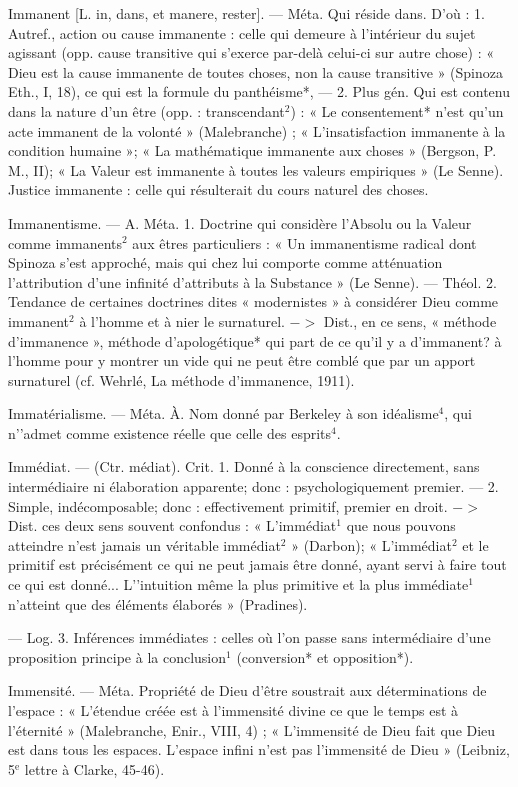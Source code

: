 Immanent [L. in, dans, et manere,
rester]. — Méta. Qui réside dans.
D'où : 1. Autref., action ou cause
immanente : celle qui demeure à
l’intérieur du sujet agissant (opp.
cause transitive qui s'exerce par-delà
celui-ci sur autre chose) : « Dieu
est la cause immanente de toutes
choses, non la cause transitive »
(Spinoza Eth., I, 18), ce qui est la
formule du panthéisme*, — 2.
Plus gén. Qui est contenu dans la
nature d’un être (opp. : transcendant$^2$) : « Le consentement* n'est
qu’un acte immanent de la volonté »
(Malebranche) ; « L’insatisfaction immanente à la condition humaine »;
« La mathématique immanente aux
choses » (Bergson, P. M., II); « La
Valeur est immanente à toutes les
valeurs empiriques » (Le Senne).
Justice immanente : celle qui résulterait du cours naturel des choses.

Immanentisme. — A. Méta. 1. Doctrine qui considère l’Absolu ou la
Valeur comme immanents$^2$ aux êtres
particuliers : « Un immanentisme
radical dont Spinoza s’est approché,
mais qui chez lui comporte comme
atténuation l'attribution d’une infinité d’attributs à la Substance »
(Le Senne). — Théol. 2. Tendance
de certaines doctrines dites « modernistes » à considérer Dieu comme
immanent$^2$ à l’homme et à nier le
surnaturel. $->$ Dist., en ce sens,
« méthode d’immanence », méthode
d’apologétique* qui part de ce qu'il
y a d’immanent? à l’homme pour y
montrer un vide qui ne peut être
comblé que par un apport surnaturel (cf. Wehrlé, La méthode d’immanence, 1911).

Immatérialisme. — Méta. À. Nom
donné par Berkeley à son idéalisme$^4$, qui n'’admet comme existence réelle que celle des esprits$^4$.

Immédiat. — (Ctr. médiat). Crit.
1. Donné à la conscience directement, sans intermédiaire ni élaboration apparente; donc : psychologiquement premier. — 2. Simple,
indécomposable; donc : effectivement
primitif, premier en droit.
$->$ Dist. ces deux sens souvent
confondus : « L’immédiat$^1$ que nous
pouvons atteindre n’est jamais un
véritable immédiat$^2$ » (Darbon);
« L'immédiat$^2$ et le primitif est précisément ce qui ne peut jamais être
donné, ayant servi à faire tout ce
qui est donné... L'’intuition même
la plus primitive et la plus immédiate$^1$ n'atteint que des éléments
élaborés » (Pradines).

— Log. 3. Inférences immédiates :
celles où l’on passe sans intermédiaire d’une proposition principe à
la conclusion$^1$ (conversion* et opposition*).

Immensité. — Méta. Propriété de
Dieu d'être soustrait aux déterminations de l’espace : « L’étendue
créée est à l’immensité divine ce
que le temps est à l'éternité » (Malebranche, Enir., VIII, 4) ; « L'immensité de Dieu fait que Dieu est
dans tous les espaces. L'espace
infini n’est pas l’immensité de Dieu »
(Leibniz, 5$^\text{e}$ lettre à Clarke, 45-46).

